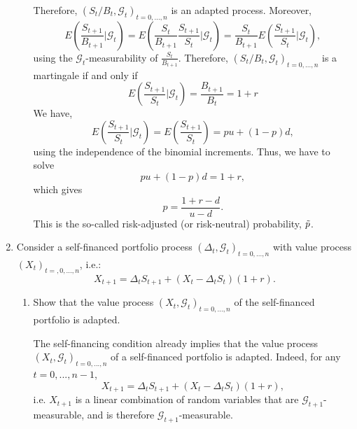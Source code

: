 \documentclass[handout,8pt]{beamer}
\begin{document}
\begin{frame}[allowframebreaks]{ }
\begin{enumerate}
\begin{enumerate}
        Therefore, $(S_t/B_t,\mathcal{G}_t)_{t=0,...,n}$ is an adapted process. Moreover,
        \begin{equation*}
            E\left(\frac{S_{t+1}}{B_{t+1}}\bigg\vert\mathcal{G}_t\right) = E\left(\frac{S_t}{B_{t+1}}\frac{S_{t+1}}{S_t}\bigg\vert \mathcal{G}_t\right) = \frac{S_t}{B_{t+1}}E \left(\frac{S_{t+1}}{S_t}\bigg\vert\mathcal{G}_t\right),
        \end{equation*}
        using the $\mathcal{G}_t$-measurability of $\frac{S_t}{B_{t+1}}$. Therefore, $(S_t/B_t, \mathcal{G}_t)_{t=0,...,n}$ is a martingale if and only if
        \begin{equation*}
            E\left(\frac{S_{t+1}}{S_t}\bigg\vert \mathcal{G}_t\right) = \frac{B_{t+1}}{B_t}=1+r
        \end{equation*}
        We have,
        \begin{equation*}
            E\left(\frac{S_{t+1}}{S_t}\bigg\vert\mathcal{G}_t\right) = E\left(\frac{S_{t+1}}{S_t}\right) = pu + (1-p)d,
        \end{equation*}
        using the independence of the binomial increments. Thus, we have to solve
        \begin{equation*}
            pu + (1-p)d = 1+r,
        \end{equation*}
        which gives
        \begin{equation*}
            p = \frac{1+r-d}{u-d}.
        \end{equation*}
        This is the so-called risk-adjusted (or risk-neutral) probability, $\Tilde{p}$.
    \end{enumerate}
    
    
    \item Consider a self-financed portfolio process $(\Delta_t,\mathcal{G}_t)_{t=0,...,n}$ with value process $(X_t)_{t=,0,...,n}$, i.e.:
    \begin{equation*}
        X_{t+1} = \Delta_tS_{t+1} + (X_t-\Delta_t S_t)(1+r).
    \end{equation*}
    
    \begin{enumerate}
        \item Show that the value process $(X_t,\mathcal{G}_t)_{t=0,...,n}$ of the self-financed portfolio is adapted.\newline
        
        The self-financing condition already implies that the value process $(X_t,\mathcal{G}_t)_{t=0,...,n}$ of a self-financed portfolio is adapted. Indeed, for any $t=0,...,n-1$,
        \begin{equation*}
            X_{t+1} = \Delta_tS_{t+1}+(X_t-\Delta_tS_t)(1+r),
        \end{equation*}
        i.e. $X_{t+1}$ is a linear combination of random variables that are $\mathcal{G}_{t+1}$-measurable, and is therefore $\mathcal{G}_{t+1}$-measurable.
        

\end{enumerate}
\end{enumerate}
\end{frame}
\end{document}
